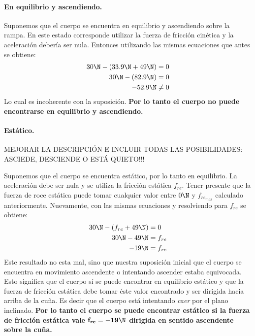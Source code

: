 \paragraph{En equilibrio y ascendiendo.}
Suponemos que el cuerpo se encuentra en equilibrio y ascendiendo sobre la rampa.
En este estado corresponde utilizar la fuerza de fricción cinética y la
aceleración debería ser nula. Entonces utilizando las mismas ecuaciones que
antes se obtiene:
\begin{align*}
  30\N - (33.9\N + 49\N) &= 0 \\
  30\N - (82.9\N) & = 0 \\
  -52.9\N & \neq 0  
\end{align*}
Lo cual es incoherente con la suposición. {\bf Por lo tanto el cuerpo no puede
encontrarse en equilibrio y ascendiendo.}


\paragraph{Estático.}


MEJORAR LA DESCRIPCIÓN E INCLUIR TODAS LAS POSIBILIDADES: ASCIEDE, DESCIENDE O
ESTÁ QUIETO!!!

Suponemos que el cuerpo se encuentra estático, por lo tanto en equilibrio. La
aceleración debe ser nula y se utiliza la fricción estática $f_{re}$. Tener
presente que la fuerza de roce estática puede tomar cualquier valor entre $0\N$
y $f_{re_{max}}$ calculado anteriormente. Nuevamente, con las mismas ecuaciones
y resolviendo para $f_{re}$ se obtiene:
\begin{align*}
  30\N - (f_{re} + 49\N) &= 0 \\
  30\N - 49\N &= f_{re}  \\
  -19\N &=  f_{re}
\end{align*}
Este resultado no esta mal, sino que nuestra suposición inicial que el cuerpo se
encuentra en movimiento ascendente o intentando ascender estaba equivocada. Esto
significa que el cuerpo sí se puede encontrar en equilibrio estático y que la
fuerza de fricción estática debe tomar éste valor encontrado y ser dirigida
hacia arriba de la cuña. Es decir que el cuerpo está intentando \emph{caer} por
el plano inclinado. {\bf Por lo tanto el cuerpo se puede encontrar estático si
la fuerza de fricción estática vale $\mathbf{f_{re} = -19\N}$ dirigida en
sentido ascendente sobre la cuña.}


